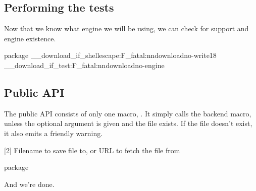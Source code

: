 \documentclass{skdoc}
\begin{document}
    \subsection{Performing the tests}
    Now that we know what engine we will be using, we can check for
     support and engine existence.
\begin{MacroCode}{package}
\__download_if_shellescape:F{\msg_fatal:nn{download}{no-write18}}
\__download_if_test:F{\msg_fatal:nn{download}{no-engine}}
\end{MacroCode}

    \subsection{Public API}
    The public API consists of only one macro, . It
    simply calls the backend macro, unless the optional argument
    is given and the file exists. If the file doesn't exist, it
    also emits a friendly warning.
    \begin{macro}{\download}[2]
        {Filename to save file to, or }
        {URL to fetch the file from}
\begin{MacroCode}{package}
\DeclareDocumentCommand{}
\end{MacroCode}
    \end{macro}
    
    And we're done.

    \Finale
    \PrintChanges
    \PrintIndex
    \printbibliography
\end{document}
